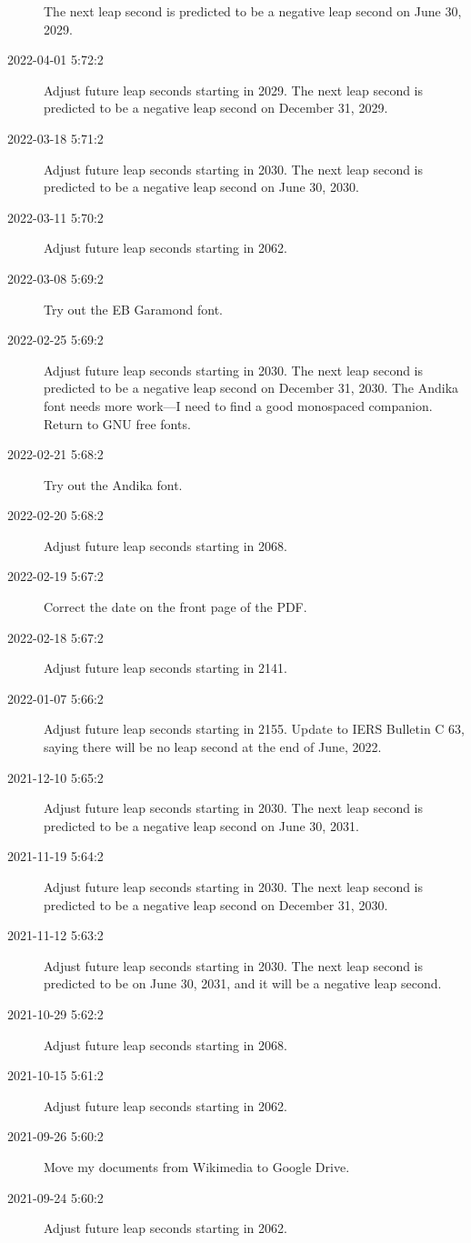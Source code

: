 \documentclass[letterpaper,twoside]{article}
\begin{document}
\begin{description}
  The next leap second is predicted to be a negative leap second
  on June 30, 2029.
\item[2022-04-01 5:72:2]Adjust future leap seconds starting in 2029.
  The next leap second is predicted to be a negative leap second
  on December 31, 2029.
\item[2022-03-18 5:71:2]Adjust future leap seconds starting in 2030.
  The next leap second is predicted to be a negative leap second
  on June 30, 2030.
\item[2022-03-11 5:70:2]Adjust future leap seconds starting in 2062.
\item[2022-03-08 5:69:2]Try out the EB Garamond font.
\item[2022-02-25 5:69:2]Adjust future leap seconds starting in 2030.
  The next leap second is predicted to be a negative leap second
  on December 31, 2030.  The Andika font needs more work---I need to
  find a good monospaced companion.  Return to GNU free fonts.
\item[2022-02-21 5:68:2]Try out the Andika font.
\item[2022-02-20 5:68:2]Adjust future leap seconds starting in 2068.
\item[2022-02-19 5:67:2]Correct the date on the front page of the PDF.
\item[2022-02-18 5:67:2]Adjust future leap seconds starting in 2141.
\item[2022-01-07 5:66:2]Adjust future leap seconds starting in 2155.
  Update to IERS Bulletin C 63, saying there will be no leap second
  at the end of June, 2022.
\item[2021-12-10 5:65:2]Adjust future leap seconds starting in 2030.
  The next leap second is predicted to be a negative leap second
  on June 30, 2031.
\item[2021-11-19 5:64:2]Adjust future leap seconds starting in 2030.
  The next leap second is predicted to be a negative leap second
  on December 31, 2030.
\item[2021-11-12 5:63:2]Adjust future leap seconds starting in 2030.
  The next leap second is predicted to be on June 30, 2031, and it
  will be a negative leap second.
\item[2021-10-29 5:62:2]Adjust future leap seconds starting in 2068.
\item[2021-10-15 5:61:2]Adjust future leap seconds starting in 2062.
\item[2021-09-26 5:60:2]Move my documents from Wikimedia to Google Drive.
\item[2021-09-24 5:60:2]Adjust future leap seconds starting in 2062.

\end{description}
\end{document}
